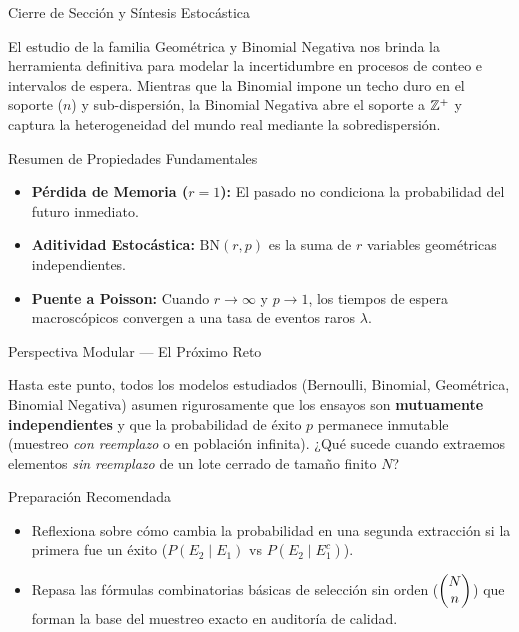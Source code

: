 \documentclass[10pt, aspectratio=169]{beamer}
\begin{document}
\begin{frame}{Cierre de Sección y Síntesis Estocástica}
  \begin{reflexion}
    El estudio de la familia Geométrica y Binomial Negativa nos brinda la herramienta definitiva para modelar la incertidumbre en procesos de conteo e intervalos de espera. Mientras que la Binomial impone un techo duro en el soporte ($n$) y sub-dispersión, la Binomial Negativa abre el soporte a $\mathbb{Z}^+$ y captura la heterogeneidad del mundo real mediante la sobredispersión.
  \end{reflexion}

  \vspace{0.3cm}
  \pause
  \begin{block}{Resumen de Propiedades Fundamentales}
    \begin{itemize}\itemsep=0.12cm
      \item \textbf{Pérdida de Memoria ($r=1$):} El pasado no condiciona la probabilidad del futuro inmediato.
      \item \textbf{Aditividad Estocástica:} $\text{BN}(r, p)$ es la suma de $r$ variables geométricas independientes.
      \item \textbf{Puente a Poisson:} Cuando $r \to \infty$ y $p \to 1$, los tiempos de espera macroscópicos convergen a una tasa de eventos raros $\lambda$.
    \end{itemize}
  \end{block}
\end{frame}

\begin{frame}{Perspectiva Modular — El Próximo Reto}
  \scriptsize
  \begin{retoclase}
    Hasta este punto, todos los modelos estudiados (Bernoulli, Binomial, Geométrica, Binomial Negativa) asumen rigurosamente que los ensayos son \textbf{mutuamente independientes} y que la probabilidad de éxito $p$ permanece inmutable (muestreo \emph{con reemplazo} o en población infinita). ¿Qué sucede cuando extraemos elementos \emph{sin reemplazo} de un lote cerrado de tamaño finito $N$?
  \end{retoclase}

  \vspace{0.08cm}
  \pause
  \begin{alertblock}{Preparación Recomendada}
    \begin{itemize}\itemsep=0.06cm
      \item Reflexiona sobre cómo cambia la probabilidad en una segunda extracción si la primera fue un éxito ($P(E_2 \mid E_1)$ vs $P(E_2 \mid E_1^c)$).
      \item Repasa las fórmulas combinatorias básicas de selección sin orden ($\begin{pmatrix} N \\ n \end{pmatrix}$) que forman la base del muestreo exacto en auditoría de calidad.
    \end{itemize}
  \end{alertblock}
\end{frame}
\end{document}
